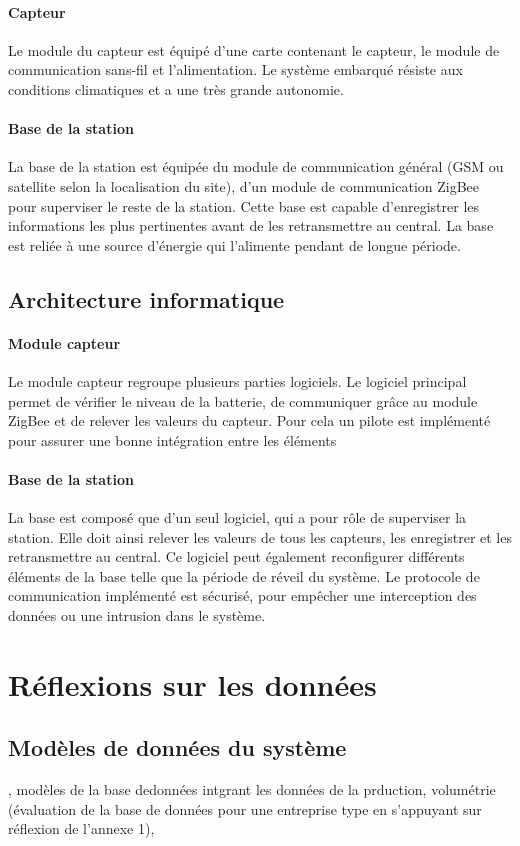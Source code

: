 \paragraph{Capteur} Le module du capteur est équipé d’une carte contenant le capteur, le module de communication sans-fil et l’alimentation. Le système embarqué résiste aux conditions climatiques et a une très grande autonomie.
\paragraph{Base de la station} La base de la station est équipée du module de communication général  (GSM ou satellite selon la localisation du site), d’un module de communication ZigBee pour superviser le reste de la station. Cette base est capable d’enregistrer les informations les plus pertinentes avant de les retransmettre au central. La base est reliée à une source d’énergie qui l’alimente pendant de longue période. 

\subsection{Architecture informatique}
\paragraph{Module capteur} Le module capteur regroupe plusieurs parties logiciels. Le logiciel principal permet de vérifier le niveau de la batterie, de communiquer grâce au module ZigBee et de relever les valeurs du capteur. Pour cela un pilote est implémenté pour assurer une bonne intégration entre les éléments
\paragraph{Base de la station} La base est composé que d’un seul logiciel, qui a pour rôle de superviser la station. Elle doit ainsi relever les valeurs de tous les capteurs, les enregistrer et les retransmettre au central. Ce logiciel peut également reconfigurer différents éléments de la base telle que la période de réveil du système. Le protocole de communication implémenté est sécurisé, pour empêcher une interception des données ou une intrusion dans le système.


\section{Réflexions sur les données}

\subsection{Modèles de données du système}
, modèles de la base dedonnées intgrant les données de la prduction, volumétrie (évaluation de la base de données
pour une entreprise type en s’appuyant sur réflexion de l’annexe 1),
